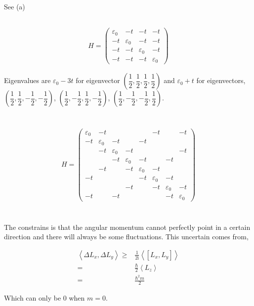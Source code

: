\documentclass[10pt,fleqn]{article}
\newcommand{\ui}{\mathrm{i}}
\newcommand{\eqar}[1]
{
  \begin{align*}
    #1
  \end{align*}
}
\newcommand{\paren}[1]{{\left({#1}\right)}}
\newcommand{\sqr}[1]{{\left[{#1}\right]}}
\newcommand{\angl}[1]{{\left\langle{#1}\right\rangle}}
\begin{document}
\subsection{}
See (a)
\subsection{}
\eqar{
  H=\begin{pmatrix}
    \varepsilon_0&-t&-t&-t\\
    -t&\varepsilon_0&-t&-t\\
    -t&-t&\varepsilon_0&-t\\
    -t&-t&-t&\varepsilon_0
  \end{pmatrix}
}
Eigenvalues are $\varepsilon_0-3t$ for eigenvector $\paren{\dfrac12,\dfrac12,\dfrac12,\dfrac12}$ and $\varepsilon_0+t$ for eigenvectors, $\paren{\dfrac12,\dfrac12,-\dfrac12,-\dfrac12}$, $\paren{\dfrac12,-\dfrac12,\dfrac12,-\dfrac12}$, $\paren{\dfrac12,-\dfrac12,-\dfrac12,\dfrac12}$.
\section{}
\subsection{}
\eqar{
  H=\begin{pmatrix}
    \varepsilon_0&-t&&&&-t&&-t\\
    -t&\varepsilon_0&-t&&-t&&&\\
    &-t&\varepsilon_0&-t&&&&-t\\
    &&-t&\varepsilon_0&-t&&-t&\\
    &-t&&-t&\varepsilon_0&-t&&\\
    -t&&&&-t&\varepsilon_0&-t&\\
    &&&-t&&-t&\varepsilon_0&-t\\
    -t&&-t&&&&-t&\varepsilon_0
  \end{pmatrix}
}
\subsection{}
\subsection{}
\section{}
The constrains is that the angular momentum cannot perfectly point in a certain
direction and there will always be some fluctuations. This uncertain comes from,
\eqar{
  \angl{\Delta L_x, \Delta L_y}\geqslant&\frac1{2\ui}\angl{\sqr{L_x, L_y}}\\
  =&\frac{\hbar}{2}\angl{L_z}\\
  =&\frac{\hbar^2m}{2}
}
Which can only be $0$ when $m=0$.
\end{document}
